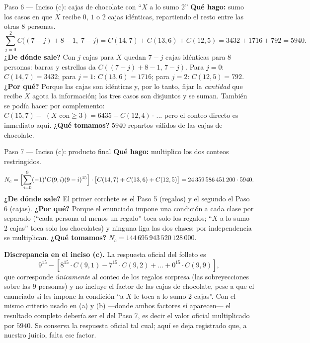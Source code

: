 \documentclass[11pt]{article}
\begin{document}
\begin{paso}{Paso 6 --- Inciso (c): cajas de chocolate con ``$X$ a lo sumo 2''}
\textbf{Qué hago:} sumo los casos en que $X$ recibe $0$, $1$ o $2$ cajas idénticas, repartiendo el resto entre las otras $8$ personas.
\[
\sum_{j=0}^{2}C\bigl((7-j)+8-1,\;7-j\bigr)=C(14,7)+C(13,6)+C(12,5)
=3432+1716+792=5940 .
\]
\textbf{¿De dónde sale?} Con $j$ cajas para $X$ quedan $7-j$ cajas idénticas para $8$ personas: barras y estrellas da $C((7-j)+8-1,\,7-j)$. Para $j=0$: $C(14,7)=3432$; para $j=1$: $C(13,6)=1716$; para $j=2$: $C(12,5)=792$.
\textbf{¿Por qué?} Porque las cajas son idénticas y, por lo tanto, fijar la \emph{cantidad} que recibe $X$ agota la información; los tres casos son disjuntos y se suman. También se podía hacer por complemento: $C(15,7)-\;(X\text{ con}\ge3)=6435-C(12,4)\cdot\!$\,... pero el conteo directo es inmediato aquí.
\textbf{¿Qué tomamos?} $5940$ repartos válidos de las cajas de chocolate.
\end{paso}

\begin{paso}{Paso 7 --- Inciso (c): producto final}
\textbf{Qué hago:} multiplico los dos conteos restringidos.
\[
N_c=\Bigl[\sum_{i=0}^{9}(-1)^iC(9,i)(9-i)^{15}\Bigr]\cdot\bigl[C(14,7)+C(13,6)+C(12,5)\bigr]
=24\,359\,586\,451\,200\cdot 5940 .
\]
\textbf{¿De dónde sale?} El primer corchete es el Paso 5 (regalos) y el segundo el Paso 6 (cajas).
\textbf{¿Por qué?} Porque el enunciado impone una condición a cada clase por separado (``cada persona al menos un regalo'' toca solo los regalos; ``$X$ a lo sumo 2 cajas'' toca solo los chocolates) y ninguna liga las dos clases; por independencia se multiplican.
\textbf{¿Qué tomamos?} $N_c=144\,695\,943\,520\,128\,000$.
\end{paso}

\begin{nota}
\textbf{Discrepancia en el inciso (c).} La respuesta oficial del folleto es
\[
9^{15}-[8^{15}\cdot C(9,1)-7^{15}\cdot C(9,2)+\ldots+0^{15}\cdot C(9,9)],
\]
que corresponde \emph{únicamente} al conteo de los regalos sorpresa (las sobreyecciones sobre las 9 personas) y no incluye el factor de las cajas de chocolate, pese a que el enunciado sí les impone la condición ``a $X$ le toca a lo sumo 2 cajas''. Con el mismo criterio usado en (a) y (b) —donde ambos factores sí aparecen— el resultado completo debería ser el del Paso 7, es decir el valor oficial multiplicado por $5940$. Se conserva la respuesta oficial tal cual; aquí se deja registrado que, a nuestro juicio, falta ese factor.
\end{nota}
\end{document}
